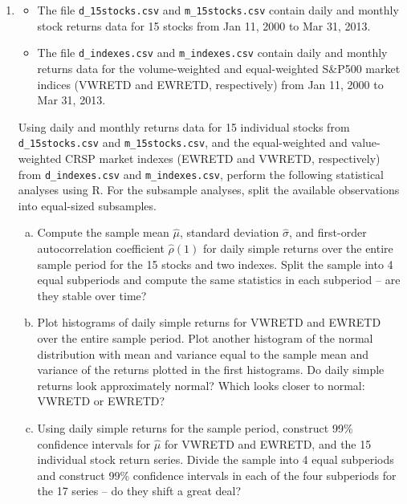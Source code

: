\begin{enumerate}[1.]

\item

\begin{itemize}
\item The file {\tt d\_15stocks.csv} and {\tt m\_15stocks.csv} contain daily and monthly stock returns data for 15 stocks from Jan 11, 2000 to Mar 31, 2013.

\item The file {\tt d\_indexes.csv} and {\tt m\_indexes.csv} contain daily and monthly returns data for the volume-weighted and equal-weighted S\&P500 market indices (VWRETD and EWRETD, respectively) from Jan 11, 2000 to Mar 31, 2013.
\end{itemize}


 Using daily and monthly returns data for 15 individual stocks from {\tt d\_15stocks.csv} and {\tt m\_15stocks.csv}, and the equal-weighted and value-weighted CRSP market indexes (EWRETD and VWRETD, respectively) from {\tt d\_indexes.csv} and {\tt m\_indexes.csv}, perform the following statistical analyses using R. For the subsample analyses, split the available observations into equal-sized subsamples.

	\begin{enumerate}[(a)]
	\item Compute the sample mean $\hat\mu$, standard deviation $\hat{\sigma}$, and first-order autocorrelation coefficient $\hat{\rho}(1)$ for daily simple returns over the entire sample period for the 15 stocks and two indexes. Split the sample into 4 equal subperiods and compute the same statistics in each subperiod -- are they stable over time?

	\item Plot histograms of daily simple returns for VWRETD and EWRETD over the entire sample period. Plot another histogram of the normal distribution with mean and variance equal to the sample mean and variance of the returns plotted in the first histograms. Do daily simple returns look approximately normal? Which looks closer to normal: VWRETD or EWRETD?

	\item Using daily simple returns for the sample period, construct 99\% confidence intervals for $\hat{\mu}$ for VWRETD and EWRETD, and the 15 individual stock return series. Divide the sample into 4 equal subperiods and construct 99\% confidence intervals in each of the four subperiods for the 17 series -- do they shift a great deal?


\end{enumerate}
\end{enumerate}
